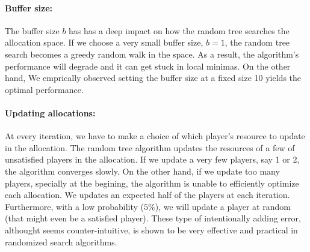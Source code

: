 \paragraph{Buffer size:} The buffer size $b$ has has a deep impact on how the random tree searches the allocation space. If we choose a very small buffer size, $b=1$, the random tree search becomes a greedy random walk in the space. As a result, the algorithm's performance will degrade and it can get stuck in local minimas. On the other hand,
We emprically observed setting the buffer size at a fixed size 10 yields the optimal performance.

\paragraph{Updating allocations:} At every iteration, we have to make a choice of which player's resource to update in the allocation.
The random tree algorithm updates the resources of a few of unsatisfied players in the allocation.
If we update a very few players, say 1 or 2, the algorithm converges slowly. On the other hand, if we update too many players, specially at the begining, the algorithm is unable to efficiently optimize each allocation. We updates an expected half of the players at each iteration. Furthermore, with a low probability ($5\%$), we will update a player at random (that might even be a satisfied player). These type of intentionally adding error, althought seems counter-intuitive, is shown to be very effective and practical in randomized search algorithms. 


